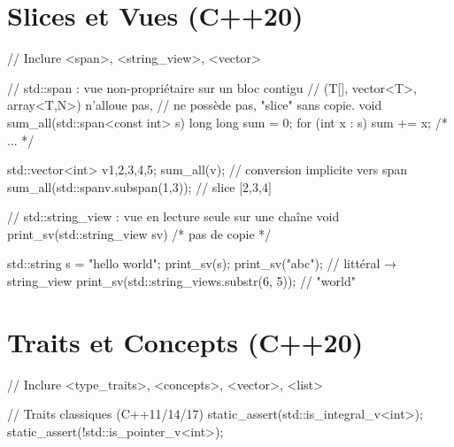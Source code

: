 \documentclass{article}
\begin{document}
\begin{multicols*}{4}

\section*{Slices et Vues (C++20)}

\begin{cppcode}
// Inclure <span>, <string_view>, <vector>

// std::span : vue non-propriétaire sur un bloc contigu
// (T[], vector<T>, array<T,N>) n'alloue pas,
// ne possède pas, "slice" sans copie.
void sum_all(std::span<const int> s) {
    long long sum = 0;
    for (int x : s) sum += x; /* ... */ }

std::vector<int> v{1,2,3,4,5};
sum_all(v);              // conversion implicite vers span
sum_all(std::span{v}.subspan(1,3)); // slice [2,3,4]

// std::string_view : vue en lecture seule sur une chaîne
void print_sv(std::string_view sv) { /* pas de copie */ }

std::string s = "hello world";
print_sv(s); print_sv("abc"); // littéral → string_view
print_sv(std::string_view{s}.substr(6, 5)); // "world"
\end{cppcode}

\section*{Traits et Concepts (C++20)}

\begin{cppcode}
// Inclure <type_traits>, <concepts>, <vector>, <list>

// Traits classiques (C++11/14/17)
static_assert(std::is_integral_v<int>);
static_assert(!std::is_pointer_v<int>);


\end{cppcode}
\end{multicols*}
\end{document}
